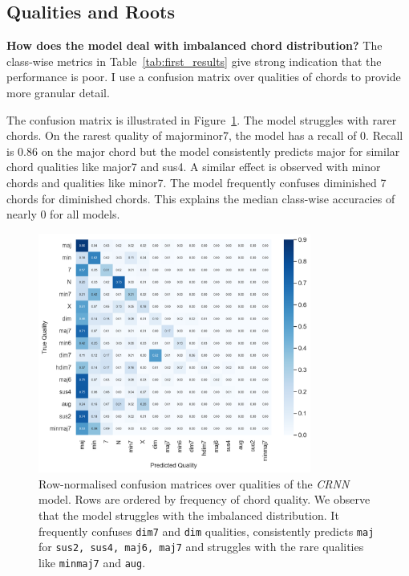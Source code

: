 \subsection{Qualities and Roots}

\textbf{How does the model deal with imbalanced chord distribution?} The class-wise metrics in Table~\ref{tab:first_results} give strong indication that the performance is poor. I use a confusion matrix over qualities of chords to provide more granular detail. 

The confusion matrix is illustrated in Figure~\ref{fig:crnn_qual_cm}. The model struggles with rarer chords. On the rarest quality of majorminor7, the model has a recall of $0$. Recall is $0.86$ on the major chord but the model consistently predicts major for similar chord qualities like major7 and sus4. A similar effect is observed with minor chords and qualities like minor7. The model frequently confuses diminished 7 chords for diminished chords. This explains the median class-wise accuracies of nearly $0$ for all models.

\begin{figure}[h]
    \centering
    \includegraphics[width=0.8\textwidth]{figures/confusion_matrix_qualities.png}
    \caption{Row-normalised confusion matrices over qualities of the \emph{CRNN} model. Rows are ordered by frequency of chord quality. We observe that the model struggles with the imbalanced distribution. It frequently confuses \texttt{dim7} and \texttt{dim} qualities, consistently predicts \texttt{maj} for \texttt{sus2, sus4, maj6, maj7} and struggles with the rare qualities like \texttt{minmaj7} and \texttt{aug}.}\label{fig:crnn_qual_cm}
\end{figure}

